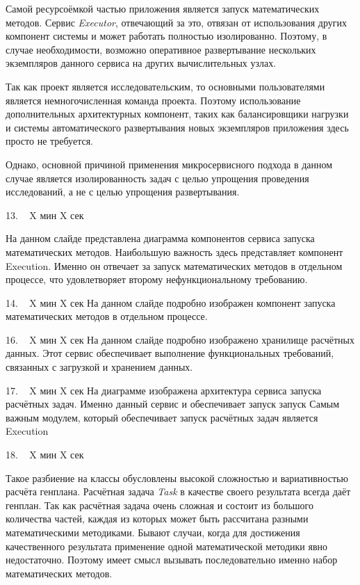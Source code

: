 \documentclass[a4paper,14pt]{extarticle}
\begin{document}
    Самой ресурсоёмкой частью приложения является запуск математических методов.
    Сервис \textit{Executor}, отвечающий за это, отвязан от использования других компонент системы
    и может работать полностью изолированно.
    Поэтому, в случае необходимости, возможно оперативное развертывание нескольких экземпляров данного сервиса
    на других вычислительных узлах.

    Так как проект является исследовательским, то основными пользователями является немногочисленная команда проекта.
    Поэтому использование дополнительных архитектурных компонент,
    таких как балансировщики нагрузки и системы автоматического развертывания новых экземпляров приложения
    здесь просто не требуется.

    Однако, основной причиной применения микросервисного подхода в данном случае является изолированность задач с целью
    упрощения проведения исследований, а не с целью упрощения развертывания.

    13. ~ X мин X сек

    На данном слайде представлена диаграмма компонентов сервиса запуска математических методов.
    Наибольшую важность здесь представляет компонент Execution. Именно он отвечает за запуск математических методов
    в отдельном процессе, что удовлетворяет второму нефункциональному требованию.

    14. ~ X мин X сек
    На данном слайде подробно изображен компонент запуска математических методов в отдельном процессе.

    16. ~ X мин X сек
    На данном слайде подробно изображено хранилище расчётных данных.
    Этот сервис обеспечивает выполнение функциональных требований, связанных с загрузкой и хранением данных.

    17. ~ X мин X сек
    На диаграмме изображена архитектура сервиса запуска расчётных задач.
    Именно данный сервис и обеспечивает запуск запуск
    Самым важным модулем, который обеспечивает запуск расчётных задач является Execution

    18. ~ X мин X сек

    Такое разбиение на классы обусловлены высокой сложностью и вариативностью расчёта генплана.
    Расчётная задача \textit{Task} в качестве своего результата всегда даёт генплан.
    Так как расчётная задача очень сложная и состоит из большого количества частей,
    каждая из которых может быть рассчитана разными математическими методиками.
    Бывают случаи, когда для достижения качественного результата применение одной математической методики
    явно недостаточно. Поэтому имеет смысл вызывать последовательно именно набор математических методов.
\end{document}
